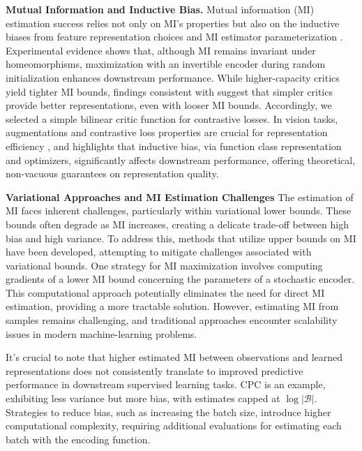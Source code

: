 \documentclass{article}
\theoremstyle{plain}
\theoremstyle{definition}
\theoremstyle{remark}
\begin{document}
\textbf{Mutual Information and Inductive Bias.} Mutual information (MI) estimation success relies not only on MI's properties but also on the inductive biases from feature representation choices and MI estimator parameterization \cite{Tschannen2020OnMIMAX}. Experimental evidence shows that, although MI remains invariant under homeomorphisms, maximization with an invertible encoder during random initialization enhances downstream performance. While higher-capacity critics yield tighter MI bounds, findings consistent with \cite{rainforth2018tighter} suggest that simpler critics provide better representations, even with looser MI bounds. Accordingly, we selected a simple bilinear critic function for contrastive losses. In vision tasks, augmentations and contrastive loss properties are crucial for representation efficiency \citep{arora2019theoretical, tosh2021contrastive, haochen2021provable}, and \cite{saunshi2022CL_InductiveBias} highlights that inductive bias, via function class representation and optimizers, significantly affects downstream performance, offering theoretical, non-vacuous guarantees on representation quality.

\textbf{Variational Approaches and MI Estimation Challenges} The estimation of MI faces inherent challenges, particularly within variational lower bounds. These bounds often degrade as MI increases, creating a delicate trade-off between high bias and high variance. To address this, methods that utilize upper bounds on MI have been developed, attempting to mitigate challenges associated with variational bounds. One strategy for MI maximization involves computing gradients of a lower MI bound concerning the parameters of a stochastic encoder. This computational approach potentially eliminates the need for direct MI estimation, providing a more tractable solution. However, estimating MI from samples remains challenging, and traditional approaches encounter scalability issues in modern machine-learning problems.

It's crucial to note that higher estimated MI between observations and learned representations does not consistently translate to improved predictive performance in downstream supervised learning tasks. CPC is an example, exhibiting less variance but more bias, with estimates capped at $\log|\mathcal{B}|$. Strategies to reduce bias, such as increasing the batch size, introduce higher computational complexity, requiring additional evaluations for estimating each batch with the encoding function.
\end{document}
